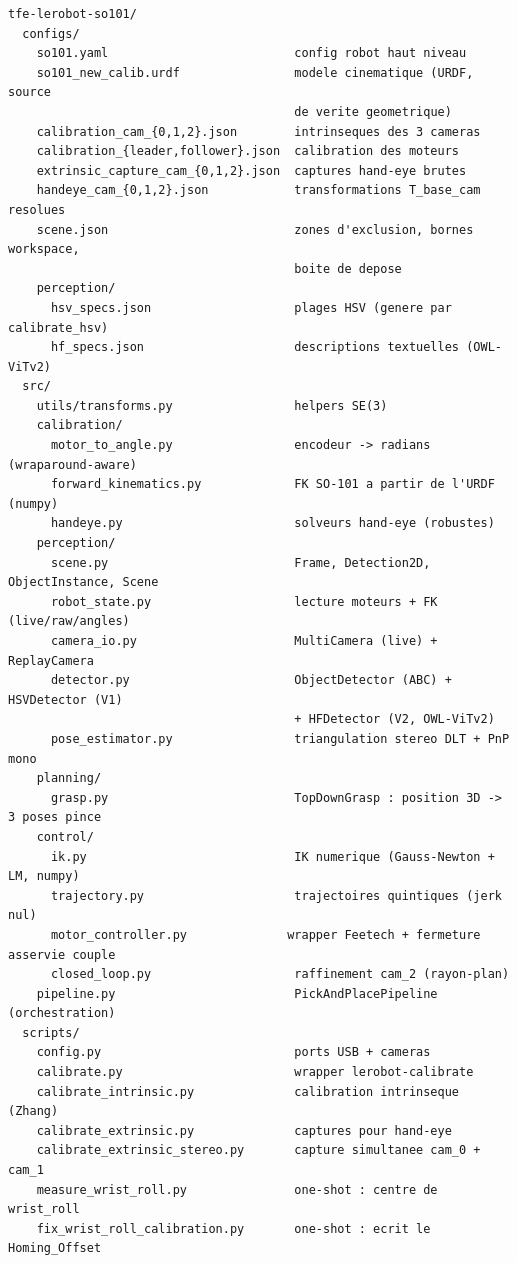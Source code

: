 \begin{verbatim}
tfe-lerobot-so101/
  configs/
    so101.yaml                          config robot haut niveau
    so101_new_calib.urdf                modele cinematique (URDF, source
                                        de verite geometrique)
    calibration_cam_{0,1,2}.json        intrinseques des 3 cameras
    calibration_{leader,follower}.json  calibration des moteurs
    extrinsic_capture_cam_{0,1,2}.json  captures hand-eye brutes
    handeye_cam_{0,1,2}.json            transformations T_base_cam resolues
    scene.json                          zones d'exclusion, bornes workspace,
                                        boite de depose
    perception/
      hsv_specs.json                    plages HSV (genere par calibrate_hsv)
      hf_specs.json                     descriptions textuelles (OWL-ViTv2)
  src/
    utils/transforms.py                 helpers SE(3)
    calibration/
      motor_to_angle.py                 encodeur -> radians (wraparound-aware)
      forward_kinematics.py             FK SO-101 a partir de l'URDF (numpy)
      handeye.py                        solveurs hand-eye (robustes)
    perception/
      scene.py                          Frame, Detection2D, ObjectInstance, Scene
      robot_state.py                    lecture moteurs + FK (live/raw/angles)
      camera_io.py                      MultiCamera (live) + ReplayCamera
      detector.py                       ObjectDetector (ABC) + HSVDetector (V1)
                                        + HFDetector (V2, OWL-ViTv2)
      pose_estimator.py                 triangulation stereo DLT + PnP mono
    planning/
      grasp.py                          TopDownGrasp : position 3D -> 3 poses pince
    control/
      ik.py                             IK numerique (Gauss-Newton + LM, numpy)
      trajectory.py                     trajectoires quintiques (jerk nul)
      motor_controller.py              wrapper Feetech + fermeture asservie couple
      closed_loop.py                    raffinement cam_2 (rayon-plan)
    pipeline.py                         PickAndPlacePipeline (orchestration)
  scripts/
    config.py                           ports USB + cameras
    calibrate.py                        wrapper lerobot-calibrate
    calibrate_intrinsic.py              calibration intrinseque (Zhang)
    calibrate_extrinsic.py              captures pour hand-eye
    calibrate_extrinsic_stereo.py       capture simultanee cam_0 + cam_1
    measure_wrist_roll.py               one-shot : centre de wrist_roll
    fix_wrist_roll_calibration.py       one-shot : ecrit le Homing_Offset

\end{verbatim}
